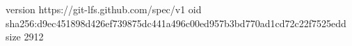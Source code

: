 version https://git-lfs.github.com/spec/v1
oid sha256:d9ec451898d426ef739875dc441a496c00ed957b3bd770ad1cd72c22f7525edd
size 2912
